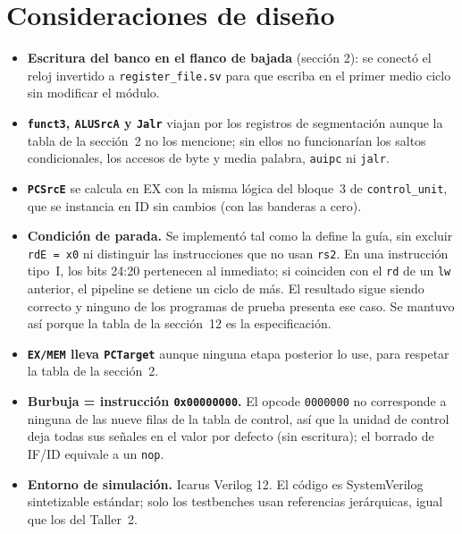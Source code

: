 \documentclass[11pt,letterpaper]{article}
\newcommand{\cod}[1]{\texttt{#1}}
\begin{document}
\section{Consideraciones de dise\~no}
\begin{itemize}
\item \textbf{Escritura del banco en el flanco de bajada} (secci\'on 2): se conect\'o el reloj invertido a
  \cod{register\_file.sv} para que escriba en el primer medio ciclo sin modificar el m\'odulo.
\item \textbf{\cod{funct3}, \cod{ALUSrcA} y \cod{Jalr}} viajan por los registros de segmentaci\'on
  aunque la tabla de la secci\'on~2 no los mencione; sin ellos no funcionar\'ian los saltos condicionales,
  los accesos de byte y media palabra, \cod{auipc} ni \cod{jalr}.
\item \textbf{\cod{PCSrcE}} se calcula en EX con la misma l\'ogica del bloque~3 de
  \cod{control\_unit}, que se instancia en ID sin cambios (con las banderas a cero).
\item \textbf{Condici\'on de parada.} Se implement\'o tal como la define la gu\'ia, sin excluir
  \cod{rdE = x0} ni distinguir las instrucciones que no usan \cod{rs2}. En una instrucci\'on tipo~I, los
  bits 24:20 pertenecen al inmediato; si coinciden con el \cod{rd} de un \cod{lw} anterior, el pipeline
  se detiene un ciclo de m\'as. El resultado sigue siendo correcto y ninguno de los programas de prueba
  presenta ese caso. Se mantuvo as\'i porque la tabla de la secci\'on~12 es la especificaci\'on.
\item \textbf{\cod{EX/MEM} lleva \cod{PCTarget}} aunque ninguna etapa posterior lo use, para respetar la
  tabla de la secci\'on~2.
\item \textbf{Burbuja = instrucci\'on \cod{0x00000000}.} El opcode \cod{0000000} no corresponde a
  ninguna de las nueve filas de la tabla de control, as\'i que la unidad de control deja todas sus
  se\~nales en el valor por defecto (sin escritura); el borrado de IF/ID equivale a un \cod{nop}.
\item \textbf{Entorno de simulaci\'on.} Icarus Verilog 12. El c\'odigo es SystemVerilog sintetizable
  est\'andar; solo los testbenches usan referencias jer\'arquicas, igual que los del Taller~2.
\end{itemize}

\appendix
\end{document}
